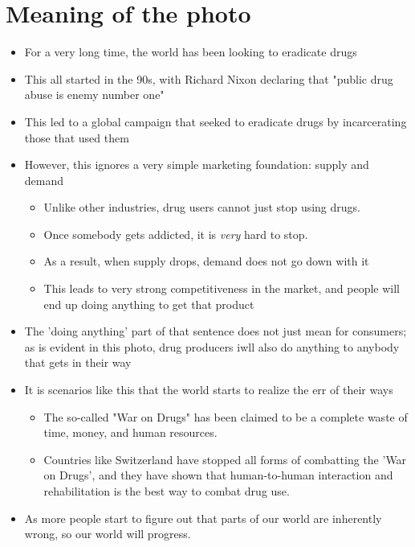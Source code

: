 \documentclass[../../main.tex]{subfiles}
\begin{document}
\section{Meaning of the photo}
\begin{itemize}
    \item For a very long time, the world has been looking to eradicate drugs
    \item This all started in the 90s, with Richard Nixon declaring that "public drug abuse is enemy number one"
    \item This led to a global campaign that seeked to eradicate drugs by incarcerating those that used them
    \item However, this ignores a very simple marketing foundation: supply and demand
    \begin{itemize}
        \item Unlike other industries, drug users cannot just stop using drugs.
        \item Once somebody gets addicted, it is \textit{very} hard to stop.
        \item As a result, when supply drops, demand does not go down with it
        \item This leads to very strong competitiveness in the market, and people will end up doing anything to get that product
    \end{itemize}
    \item The 'doing anything' part of that sentence does not just mean for consumers; as is evident in this photo, drug producers iwll also do anything to anybody that gets in their way
    \item It is scenarios like this that the world starts to realize the err of their ways
    \begin{itemize}
        \item The so-called "War on Drugs" has been claimed to be a complete waste of time, money, and human resources.
        \item Countries like Switzerland have stopped all forms of combatting the 'War on Drugs', and they have shown that human-to-human interaction and rehabilitation is the best way to combat drug use.
    \end{itemize}
    \item As more people start to figure out that parts of our world are inherently wrong, so our world will progress.
\end{itemize}
\end{document}
